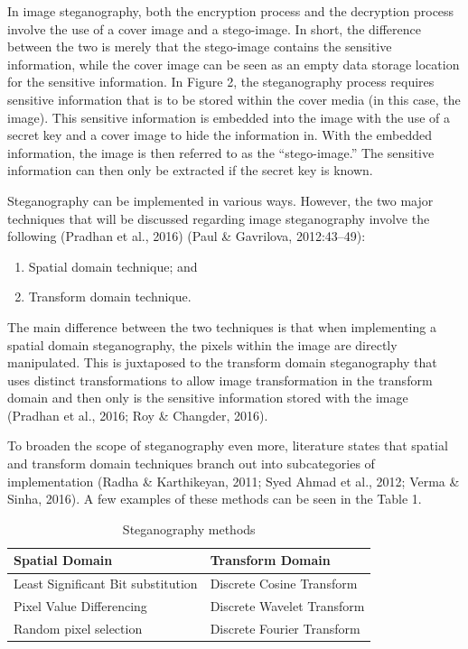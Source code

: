 In image steganography, both the encryption process and the decryption process involve the use of a cover image and a stego-image. In short, the difference between the two is merely that the stego-image contains the sensitive information, while the cover image can be seen as an empty data storage location for the sensitive information. In Figure 2, the steganography process requires sensitive information that is to be stored within the cover media (in this case, the image). This sensitive information is embedded into the image with the use of a secret key and a cover image to hide the information in. With the embedded information, the image is then referred to as the “stego-image.” The sensitive information can then only be extracted if the secret key is known.

Steganography can be implemented in various ways. However, the two major techniques that will be discussed regarding image steganography involve the following (Pradhan et al., 2016) (Paul \& Gavrilova, 2012:43–49):

\begin{enumerate}[label=\roman*.]
	\item Spatial domain technique; and 
	\item Transform domain technique.
\end{enumerate}

The main difference between the two techniques is that when implementing a spatial domain steganography, the pixels within the image are directly manipulated. This is juxtaposed to the transform domain steganography that uses distinct transformations to allow image transformation in the transform domain and then only is the sensitive information stored with the image (Pradhan et al., 2016; Roy \& Changder, 2016).

To broaden the scope of steganography even more, literature states that spatial and transform domain techniques branch out into subcategories of implementation (Radha \& Karthikeyan, 2011; Syed Ahmad et al., 2012; Verma \& Sinha, 2016). A few examples of these methods can be seen in the Table 1.

\begin{table}[h!]
\caption{Steganography methods}
\centering
 \begin{tabular}{|p{} | p{}|} 
 \hline
	\textbf{Spatial Domain} & \textbf{Transform Domain} \\ [1ex] 
 \hline\hline 
 Least Significant Bit substitution & Discrete Cosine Transform  \\[1ex]
 \hline 
 Pixel Value Differencing & Discrete Wavelet Transform  \\[1ex]
 \hline
 Random pixel selection & Discrete Fourier Transform  \\ [1ex] 
 \hline
 \end{tabular}
\end{table}


